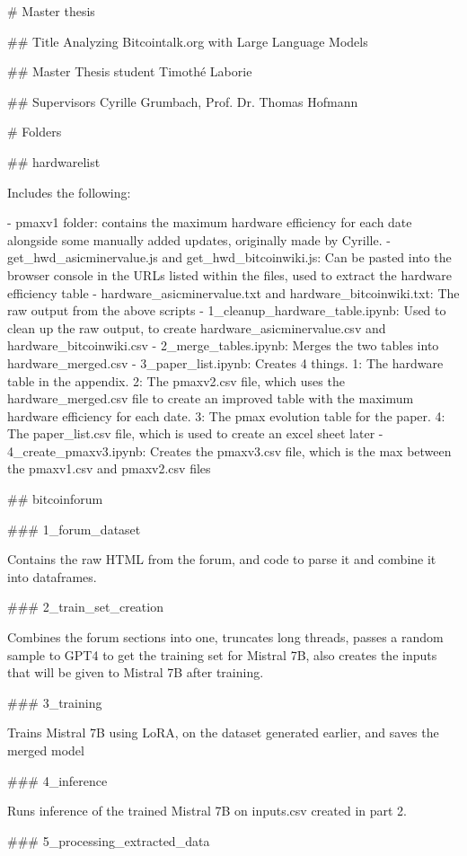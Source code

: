 # Master thesis

## Title
Analyzing Bitcointalk.org with Large Language Models

## Master Thesis student
Timothé Laborie

## Supervisors
Cyrille Grumbach, Prof. Dr. Thomas Hofmann


# Folders

## hardwarelist

Includes the following:

- pmaxv1 folder: contains the maximum hardware efficiency for each date alongside some manually added updates, originally made by Cyrille.
- get_hwd_asicminervalue.js and get_hwd_bitcoinwiki.js: Can be pasted into the browser console in the URLs listed within the files, used to extract the hardware efficiency table
- hardware_asicminervalue.txt and hardware_bitcoinwiki.txt: The raw output from the above scripts
- 1_cleanup_hardware_table.ipynb: Used to clean up the raw output, to create hardware_asicminervalue.csv and hardware_bitcoinwiki.csv
- 2_merge_tables.ipynb: Merges the two tables into hardware_merged.csv
- 3_paper_list.ipynb: Creates 4 things. 1: The hardware table in the appendix. 2: The pmaxv2.csv file, which uses the hardware_merged.csv file to create an improved table with the maximum hardware efficiency for each date. 3: The pmax evolution table for the paper. 4: The paper_list.csv file, which is used to create an excel sheet later
- 4_create_pmaxv3.ipynb: Creates the pmaxv3.csv file, which is the max between the pmaxv1.csv and pmaxv2.csv files


## bitcoinforum

### 1_forum_dataset

Contains the raw HTML from the forum, and code to parse it and combine it into dataframes.

### 2_train_set_creation

Combines the forum sections into one, truncates long threads, passes a random sample to GPT4 to get the training set for Mistral 7B, also creates the inputs that will be given to Mistral 7B after training.

### 3_training

Trains Mistral 7B using LoRA, on the dataset generated earlier, and saves the merged model


### 4_inference

Runs inference of the trained Mistral 7B on inputs.csv created in part 2.

### 5_processing_extracted_data

